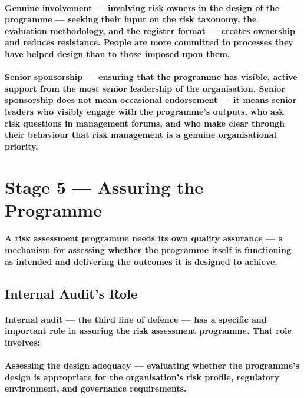 \paragraph{\textbf{Genuine involvement} — involving risk owners in the design of the programme — seeking their input on the risk taxonomy, the evaluation methodology, and the register format — creates ownership and reduces resistance. People are more committed to processes they have helped design than to those imposed upon them.}
\paragraph{\textbf{Senior sponsorship} — ensuring that the programme has visible, active support from the most senior leadership of the organisation. Senior sponsorship does not mean occasional endorsement — it means senior leaders who visibly engage with the programme's outputs, who ask risk questions in management forums, and who make clear through their behaviour that risk management is a genuine organisational priority.}

\section{Stage 5 — Assuring the Programme}
\paragraph{A risk assessment programme needs its own quality assurance — a mechanism for assessing whether the programme itself is functioning as intended and delivering the outcomes it is designed to achieve.}

\subsection{Internal Audit's Role}
\paragraph{Internal audit — the third line of defence — has a specific and important role in assuring the risk assessment programme. That role involves:}
\paragraph{\textbf{Assessing the design adequacy} — evaluating whether the programme's design is appropriate for the organisation's risk profile, regulatory environment, and governance requirements.}

